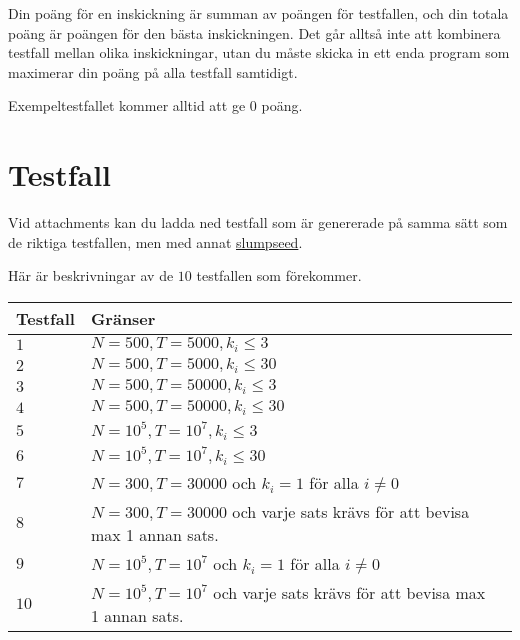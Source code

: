 Din poäng för en inskickning är summan av poängen för testfallen, och din totala poäng är poängen för den bästa inskickningen.
Det går alltså inte att kombinera testfall mellan olika inskickningar, utan du måste skicka in ett enda program som
maximerar din poäng på alla testfall samtidigt.

Exempeltestfallet kommer alltid att ge $0$ poäng.

\section*{Testfall}
Vid attachments kan du ladda ned testfall som är genererade på samma sätt som de riktiga testfallen,
men med annat \href{https://en.wikipedia.org/wiki/Random_seed}{slumpseed}.

Här är beskrivningar av de $10$ testfallen som förekommer.

\noindent
\begin{tabular}{| l | l | l |}
\hline
\textbf{Testfall} & \textbf{Gränser}  \\ \hline
$1$       & $N=500,T=5000,k_i \le 3$  \\ \hline
$2$       & $N=500,T=5000,k_i \le 30$  \\ \hline
$3$       & $N=500,T=50000,k_i \le 3$  \\ \hline
$4$       & $N=500,T=50000,k_i \le 30$  \\ \hline
$5$       & $N=10^5,T=10^7,k_i \le 3$  \\ \hline
$6$       & $N=10^5,T=10^7,k_i \le 30$  \\ \hline
$7$       & $N=300,T=30000$ och $k_i=1$ för alla $i\neq0$\\ \hline
$8$       & $N=300,T=30000$ och varje sats krävs för att bevisa max 1 annan sats. \\ \hline
$9$       & $N=10^5,T=10^7$ och $k_i=1$ för alla $i\neq0$ \\ \hline
$10$      & $N=10^5,T=10^7$ och varje sats krävs för att bevisa max 1 annan sats.  \\ \hline
\end{tabular}
